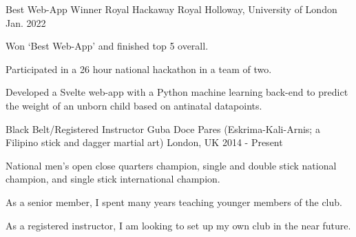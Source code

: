


\begin{cventries}


\cventry
{Best Web-App Winner} %
{Royal Hackaway} %
{Royal Holloway, University of London} %
{Jan. 2022} %
{ %
\begin{cvitems}\vspace{-4mm}
\item {Won `Best Web-App' and finished top 5 overall.}
\item {Participated in a 26 hour national hackathon in a team of two.}
\item {Developed a Svelte web-app with a Python machine learning back-end to predict the weight of an unborn child based on antinatal datapoints.}
\vspace{4mm}\end{cvitems}
}


\cventry
{Black Belt/Registered Instructor} %
{Guba Doce Pares \tiny{(Eskrima-Kali-Arnis; a Filipino stick and dagger martial art)}} %
{London, UK} %
{2014 - Present} %
{ %
\begin{cvitems}\vspace{-4mm}
\item {National men's open close quarters champion, single and double stick national champion, and single stick international champion.}
\item {As a senior member, I spent many years teaching younger members of the club.}
\item {As a registered instructor, I am looking to set up my own club in the near future.}
\vspace{4mm}\end{cvitems}
}


\end{cventries}

